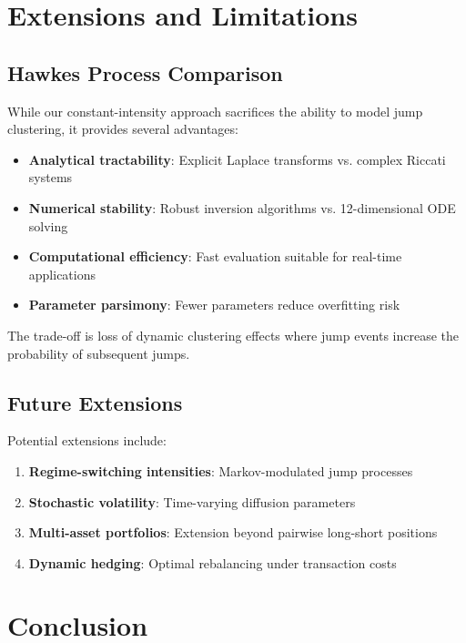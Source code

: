 \documentclass{article}
\theoremstyle{definition}
\begin{document}
\section{Extensions and Limitations}

\subsection{Hawkes Process Comparison}

While our constant-intensity approach sacrifices the ability to model jump clustering, it provides several advantages:
\begin{itemize}
    \item \textbf{Analytical tractability}: Explicit Laplace transforms vs. complex Riccati systems
    \item \textbf{Numerical stability}: Robust inversion algorithms vs. 12-dimensional ODE solving
    \item \textbf{Computational efficiency}: Fast evaluation suitable for real-time applications
    \item \textbf{Parameter parsimony}: Fewer parameters reduce overfitting risk
\end{itemize}

The trade-off is loss of dynamic clustering effects where jump events increase the probability of subsequent jumps.

\subsection{Future Extensions}

Potential extensions include:
\begin{enumerate}
    \item \textbf{Regime-switching intensities}: Markov-modulated jump processes
    \item \textbf{Stochastic volatility}: Time-varying diffusion parameters  
    \item \textbf{Multi-asset portfolios}: Extension beyond pairwise long-short positions
    \item \textbf{Dynamic hedging}: Optimal rebalancing under transaction costs
\end{enumerate}

\section{Conclusion}
\end{document}
